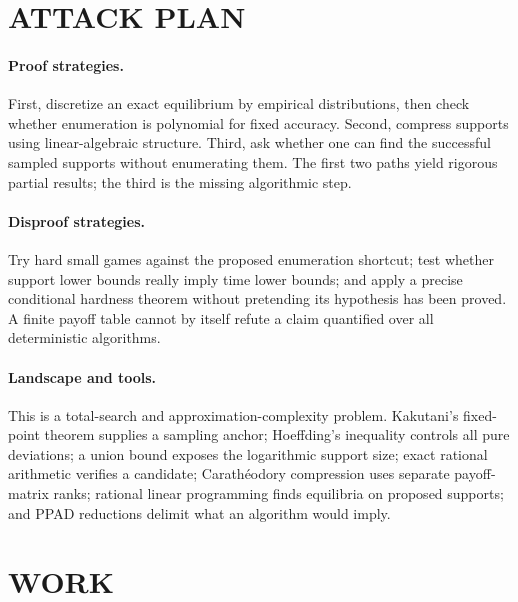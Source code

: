 \documentclass[11pt,a4paper]{article}
\theoremstyle{definition}
\theoremstyle{remark}
\begin{document}
\section{ATTACK PLAN}
\paragraph{Proof strategies.}
First, discretize an exact equilibrium by empirical distributions, then check whether enumeration is polynomial for fixed accuracy. Second, compress supports using linear-algebraic structure. Third, ask whether one can find the successful sampled supports without enumerating them. The first two paths yield rigorous partial results; the third is the missing algorithmic step.

\paragraph{Disproof strategies.}
Try hard small games against the proposed enumeration shortcut; test whether support lower bounds really imply time lower bounds; and apply a precise conditional hardness theorem without pretending its hypothesis has been proved. A finite payoff table cannot by itself refute a claim quantified over all deterministic algorithms.

\paragraph{Landscape and tools.}
This is a total-search and approximation-complexity problem. Kakutani's fixed-point theorem supplies a sampling anchor; Hoeffding's inequality controls all pure deviations; a union bound exposes the logarithmic support size; exact rational arithmetic verifies a candidate; Carath\'eodory compression uses separate payoff-matrix ranks; rational linear programming finds equilibria on proposed supports; and PPAD reductions delimit what an algorithm would imply.

\section{WORK}
\end{document}
